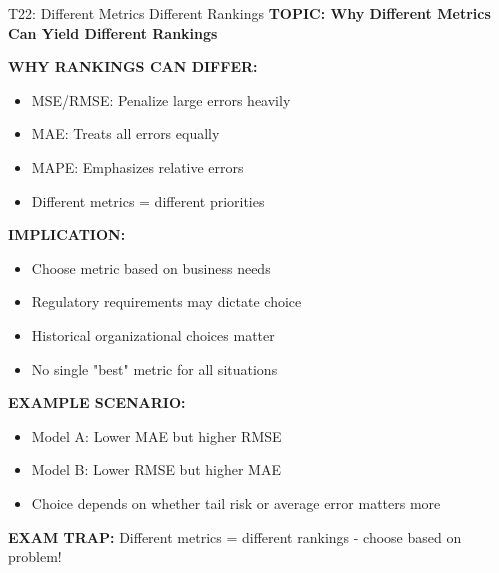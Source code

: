 \documentclass[8pt]{beamer}
\begin{document}
	\begin{frame}{T22: Different Metrics Different Rankings}
		\fontsize{6.5}{7.5}\selectfont
		\textbf{TOPIC: Why Different Metrics Can Yield Different Rankings}
		
		\vspace{0.1cm}
		\textbf{WHY RANKINGS CAN DIFFER:}
		\begin{itemize}
			\item \textcolor{myblue}{MSE/RMSE:} Penalize large errors heavily
			\item \textcolor{myblue}{MAE:} Treats all errors equally
			\item \textcolor{myblue}{MAPE:} Emphasizes relative errors
			\item Different metrics = different priorities
		\end{itemize}
		
		\vspace{0.1cm}
		\textbf{IMPLICATION:}
		\begin{itemize}
			\item Choose metric based on business needs
			\item Regulatory requirements may dictate choice
			\item Historical organizational choices matter
			\item No single "best" metric for all situations
		\end{itemize}
		
		\vspace{0.1cm}
		\textbf{EXAMPLE SCENARIO:}
		\begin{itemize}
			\item Model A: Lower MAE but higher RMSE
			\item Model B: Lower RMSE but higher MAE
			\item Choice depends on whether tail risk or average error matters more
		\end{itemize}
		
		\textcolor{myred}{\textbf{EXAM TRAP:}} Different metrics = \textcolor{myblue}{different rankings} - choose based on problem!
	\end{frame}
	
\end{document}
